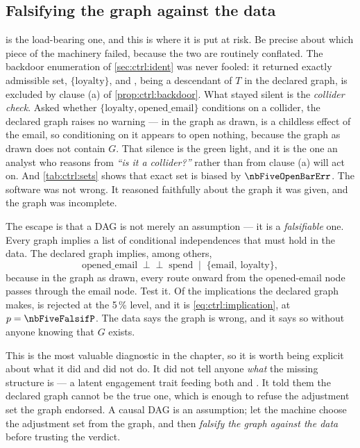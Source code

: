 \subsection*{Falsifying the graph against the data}

 is the load-bearing one, and this is where it is put at risk. Be precise about
which piece of the machinery failed, because the two are routinely conflated. The backdoor
enumeration of \cref{sec:ctrl:ident} was never fooled: it returned exactly \nbFiveNAdjSets{}
admissible set, $\{\text{loyalty}\}$, and , being a descendant of $T$ in the
declared graph, is excluded by clause (a) of \cref{prop:ctrl:backdoor}. What stayed silent is the
\emph{collider check}. Asked whether $\{\text{loyalty}, \text{opened\_email}\}$ conditions on a
collider, the declared graph raises no warning --- in the graph as drawn,  is a
childless effect of the email, so conditioning on it appears to open nothing, because the graph as
drawn does not contain $G$. That silence is the green light, and it is the one an analyst who
reasons from \emph{``is it a collider?''} rather than from clause (a) will act on. And
\cref{tab:ctrl:sets} shows that exact set is biased by $\nbFiveOpenBarErr$. The software was not
wrong. It reasoned faithfully about the graph it was given, and the graph was incomplete.

The escape is that a DAG is not merely an assumption --- it is a \emph{falsifiable} one. Every
graph implies a list of conditional independences that must hold in the data. The declared graph
implies, among others,
%
\begin{equation}
  \text{opened\_email} \;\perp\!\!\!\perp\; \text{spend} \;\;\Big|\;\;
  \{\text{email},\ \text{loyalty}\} ,
  \label{eq:ctrl:implication}
\end{equation}
%
because in the graph as drawn, every route onward from the opened-email node passes through the
email node. Test it. Of the \nbFiveFalsifNTests{} implications the declared graph makes,
\nbFiveFalsifNViolations{} is rejected at the 5\,\% level, and it is \cref{eq:ctrl:implication},
at $p = \nbFiveFalsifP$. The data says the graph is wrong, and it says so without anyone knowing
that $G$ exists.

This is the most valuable diagnostic in the chapter, so it is worth being explicit about what it
did and did not do. It did not tell anyone \emph{what} the missing structure is --- a latent
engagement trait feeding both  and . It told them the declared
graph cannot be the true one, which is enough to refuse the adjustment set the graph endorsed. A
causal DAG is an assumption; let the machine choose the adjustment set from the graph, and then
\emph{falsify the graph against the data} before trusting the verdict.

